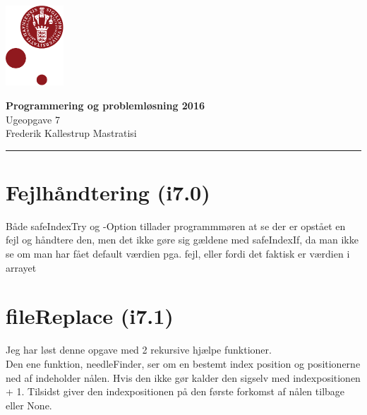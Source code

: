 \documentclass[12pt, a4paper, hidelinks]{article}
\begin{document}
\begin{minipage}[b]{1.0\linewidth}
\includegraphics[height=30mm]{KULogo}

\vspace*{-16ex}
\begin{center}
    {\Large \bf Programmering og problemløsning 2016} \vspace*{1ex} \\
    {\large Ugeopgave 7} \vspace*{1ex} \\
    {\large Frederik Kallestrup Mastratisi}
\end{center}
\vspace*{-3pt}
{\color{KU-red}\hrule}
\end{minipage}
\vspace{2ex}

\tableofcontents \newpage

\setcounter{section}{0}
\setcounter{subsection}{-1}



\section{ Fejlhåndtering (i7.0)}

Både safeIndexTry og -Option tillader programmmøren at se der er opstået en fejl og håndtere den, men det ikke gøre sig gældene med safeIndexIf, da man ikke se om man har fået default værdien pga. fejl, eller fordi det faktisk er værdien i arrayet

\section { fileReplace (i7.1) }

Jeg har løst denne opgave med 2 rekursive hjælpe funktioner. \\

Den ene funktion, needleFinder, ser om en bestemt index position og positionerne ned af indeholder nålen. Hvis den ikke gør kalder den sigselv med indexpositionen + 1. Tilsidst giver den indexpositionen på den første forkomst af nålen tilbage eller None.\\
\end{document}
